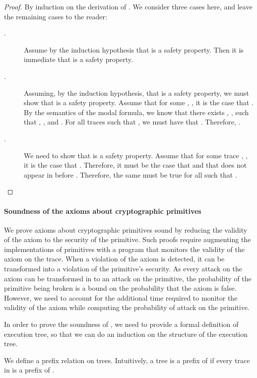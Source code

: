 \begin{proof}
By induction on the derivation of . We consider three
cases here, and leave the remaining cases to the reader:
\begin{description}
  \item[.] Assume by the induction hypothesis that  is a safety property.
    Then it is immediate that  is
a safety property.

  \item[.] Assuming, by the induction hypothesis,
    that  is a safety property, we must
    show that  is a safety property. Assume
    that for some , , it is the case that
    . By the
    semantics of the modal formula,
    we know that there exists , ,  such that ,
    , and . For
    all traces  such that , we must have
    that . Therefore,
    .

  \item[.] We need to show that  is a safety
    property. Assume that for some trace , ,
    it is the case that .
    Therefore, it must be the case that  and that  does not appear in  before . Therefore, the same must be true for all
     such that .
\end{description}
\end{proof}


\paragraph*{Soundness of the axioms about cryptographic primitives}
We prove axioms about cryptographic primitives sound by reducing the validity
of the axiom to the security of the primitive. Such proofs require augmenting
the implementations of primitives with a program that monitors the validity of
the axiom on the trace. When a violation of the axiom is detected, it can be
transformed into a violation of the primitive's security.  As every attack on
the axiom can be transformed in to an attack on the primitive, the probability
of the primitive being broken is a bound on the probability that the axiom is
false. However, we need to account for the additional time required to monitor
the validity of the axiom while computing the probability of attack on the
primitive.

In order to prove the soundness of , we need to provide a
formal definition of execution tree, so that we can do an induction on
the structure of the execution tree.

We define a prefix relation on trees. Intuitively, a tree 
is a prefix of  if every trace in  is a prefix of .

